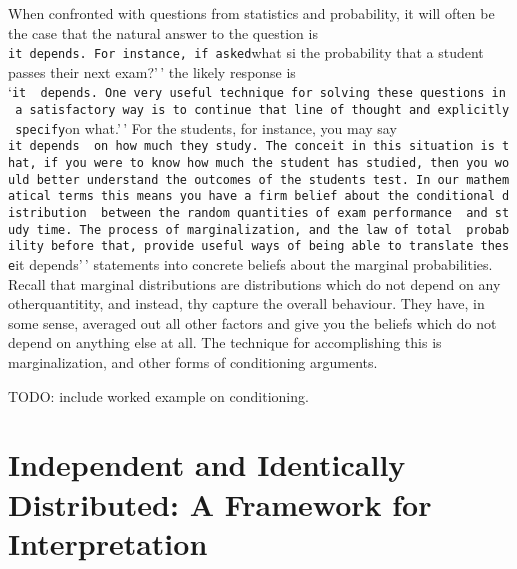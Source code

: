 \documentclass[
  letterpaper,
  DIV=11,
  numbers=noendperiod]{scrreprt}
\begin{document}
When confronted with questions from statistics and probability, it will
often be the case that the natural answer to the question is
\texttt{it\ depends.\textquotesingle{}\textquotesingle{}\ For\ instance,\ if\ asked}what
si the probability that a student passes their next exam?'\,' the likely
response is
`\texttt{it\ \ depends.\textquotesingle{}\textquotesingle{}\ One\ very\ useful\ technique\ for\ solving\ these\ questions\ in\ a\ satisfactory\ way\ is\ to\ continue\ that\ line\ of\ thought\ and\ explicitly\ specify}on
what.'\,' For the students, for instance, you may say
\texttt{it\ depends\ \ on\ how\ much\ they\ study.\textquotesingle{}\textquotesingle{}\ The\ conceit\ in\ this\ situation\ is\ that,\ if\ you\ were\ to\ know\ how\ much\ the\ student\ has\ studied,\ then\ you\ would\ better\ understand\ the\ outcomes\ of\ the\ student\textquotesingle{}s\ test.\ In\ our\ mathematical\ terms\ this\ means\ you\ have\ a\ firm\ belief\ about\ the\ conditional\ distribution\ \ between\ the\ random\ quantities\ of\ exam\ performance\ \ and\ study\ time.\ The\ process\ of\ marginalization,\ and\ the\ law\ of\ total\ \ probability\ before\ that,\ provide\ useful\ ways\ of\ being\ able\ to\ translate\ these}it
depends'\,' statements into concrete beliefs about the marginal
probabilities. Recall that marginal distributions are distributions
which do not depend on any otherquantitity, and instead, thy capture the
overall behaviour. They have, in some sense, averaged out all other
factors and give you the beliefs which do not depend on anything else at
all. The technique for accomplishing this is marginalization, and other
forms of conditioning arguments.

TODO: include worked example on conditioning.

\section{Independent and Identically Distributed: A Framework for
Interpretation}\label{independent-and-identically-distributed-a-framework-for-interpretation}
\end{document}
